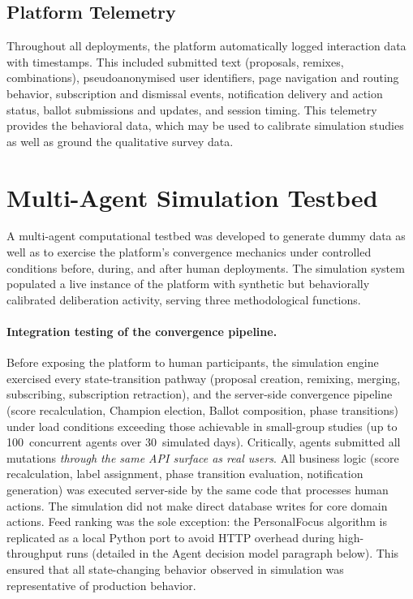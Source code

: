 \documentclass[a4paper, 12pt, twoside]{iviathesis}
\begin{document}
\subsection{Platform Telemetry}
\label{sec:telemetry}
Throughout all deployments, the platform automatically logged interaction data with timestamps. This included submitted text (proposals, remixes, combinations), pseudoanonymised user identifiers, page navigation and routing behavior, subscription and dismissal events, notification delivery and action status, ballot submissions and updates, and session timing. This telemetry provides the behavioral data, which may be used to calibrate simulation studies as well as ground the qualitative survey data.

\section{Multi-Agent Simulation Testbed}
\label{sec:method-c}
A multi-agent computational testbed was developed to generate dummy data as well as to exercise the platform's convergence mechanics under controlled conditions before, during, and after human deployments. The simulation system populated a live instance of the platform with synthetic but behaviorally calibrated deliberation activity, serving three methodological functions.

\paragraph{Integration testing of the convergence pipeline.}
Before exposing the platform to human participants, the simulation engine exercised every state-transition pathway (proposal creation, remixing, merging, subscribing, subscription retraction), and the server-side convergence pipeline (score recalculation, Champion election, Ballot composition, phase transitions) under load conditions exceeding those achievable in small-group studies (up to 100~concurrent agents over 30~simulated days). Critically, agents submitted all mutations \textit{through the same API surface as real users}. All business logic (score recalculation, label assignment, phase transition evaluation, notification generation) was executed server-side by the same code that processes human actions. The simulation did not make direct database writes for core domain actions. Feed ranking was the sole exception: the PersonalFocus algorithm is replicated as a local Python port to avoid HTTP overhead during high-throughput runs (detailed in the Agent decision model paragraph below). This ensured that all state-changing behavior observed in simulation was representative of production behavior.
\end{document}
